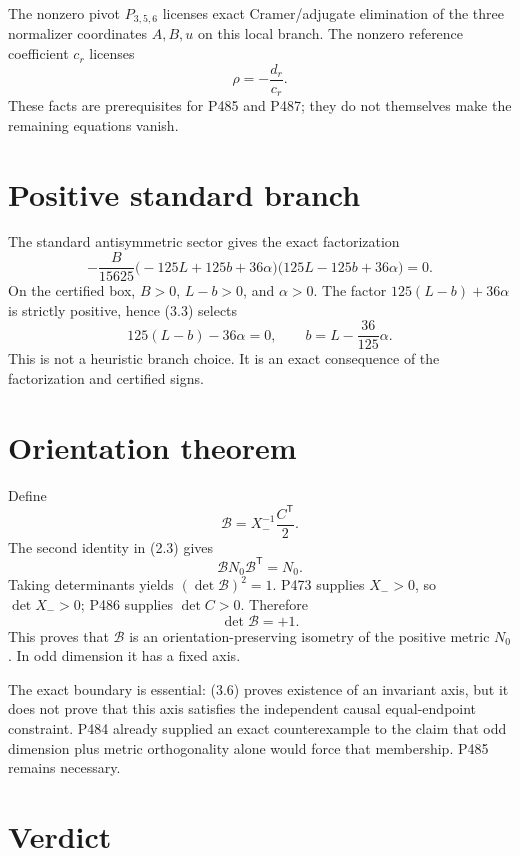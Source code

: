 \documentclass[11pt,a4paper,openany]{report}
\begin{document}
The nonzero pivot \(P_{3,5,6}\) licenses exact Cramer/adjugate elimination of
the three normalizer coordinates \(A,B,u\) on this local branch. The nonzero
reference coefficient \(c_r\) licenses
\[
 \rho=-\frac{d_r}{c_r}.                                            \tag{3.2}
\]
These facts are prerequisites for P485 and P487; they do not themselves make
the remaining equations vanish.

\section{Positive standard branch}

The standard antisymmetric sector gives the exact factorization
\[
 -\frac{B}{15625}
 \bigl(-125L+125b+36\alpha\bigr)
 \bigl(125L-125b+36\alpha\bigr)=0.                                \tag{3.3}
\]
On the certified box, \(B>0\), \(L-b>0\), and \(\alpha>0\). The factor
\(125(L-b)+36\alpha\) is strictly positive, hence (3.3) selects
\[
 125(L-b)-36\alpha=0,
 \qquad b=L-\frac{36}{125}\alpha.                                 \tag{3.4}
\]
This is not a heuristic branch choice. It is an exact consequence of the
factorization and certified signs.

\section{Orientation theorem}

Define
\[
 \mathcal B=X_-^{-1}\frac{C^{\mathsf T}}2.
\]
The second identity in (2.3) gives
\[
 \mathcal B N_0\mathcal B^{\mathsf T}=N_0.                         \tag{3.5}
\]
Taking determinants yields \((\det\mathcal B)^2=1\). P473 supplies
\(X_->0\), so \(\det X_->0\); P486 supplies \(\det C>0\). Therefore
\[
 \det\mathcal B=+1.                                                \tag{3.6}
\]
This proves that \(\mathcal B\) is an orientation-preserving isometry of the
positive metric \(N_0\). In odd dimension it has a fixed axis.

The exact boundary is essential: (3.6) proves existence of an invariant axis,
but it does not prove that this axis satisfies the independent causal
equal-endpoint constraint. P484 already supplied an exact counterexample to
the claim that odd dimension plus metric orthogonality alone would force that
membership. P485 remains necessary.

\section{Verdict}
\end{document}
